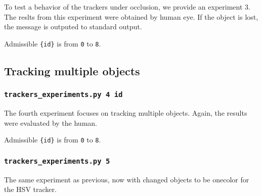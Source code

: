 To test a behavior of the trackers under occlusion, we provide an experiment 3.
The reslts from this experiment were obtained by human eye. If the object is
lost, the message is outputed to standard output.

Admissible \verb+{id}+ is from \verb+0+ to \verb+8+.

\subsection*{Tracking multiple objects}

\subsubsection*{\texttt{trackers{\_}experiments.py 4 {id}}}

The fourth experiment focuses on tracking multiple objects. Again, the results were
evaluated by the human. 

Admissible \verb+{id}+ is from \verb+0+ to \verb+8+.

\subsubsection*{\texttt{trackers{\_}experiments.py 5}}

The same experiment as previous, now with changed objects to be onecolor for
the HSV tracker.

